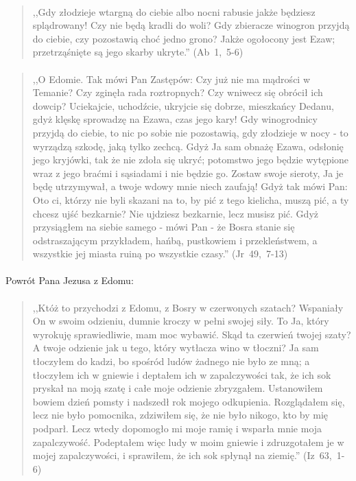 \documentclass[10pt,a4paper,oneside]{article}
\begin{document}
\paragraph{}
\begin{quote}
,,Gdy złodzieje wtargną do ciebie albo nocni rabusie jakże będziesz splądrowany! Czy nie będą kradli do woli? Gdy zbieracze winogron przyjdą do ciebie, czy pozostawią choć jedno grono? Jakże ogołocony jest Ezaw; przetrząśnięte są jego skarby ukryte.'' \mbox{(Ab 1, 5-6)}
\end{quote}
\paragraph{}
\begin{quote}
,,O Edomie. Tak mówi Pan Zastępów: Czy już nie ma mądrości w Temanie? Czy zginęła rada roztropnych? Czy wniwecz się obrócił ich dowcip? Uciekajcie, uchodźcie, ukryjcie się dobrze, mieszkańcy Dedanu, gdyż klęskę sprowadzę na Ezawa, czas jego kary! Gdy winogrodnicy przyjdą do ciebie, to nic po sobie nie pozostawią, gdy złodzieje w nocy - to wyrządzą szkodę, jaką tylko zechcą. Gdyż Ja sam obnażę Ezawa, odsłonię jego kryjówki, tak że nie zdoła się ukryć; potomstwo jego będzie wytępione wraz z jego braćmi i sąsiadami i nie będzie go. Zostaw swoje sieroty, Ja je będę utrzymywał, a twoje wdowy mnie niech zaufają! Gdyż tak mówi Pan: Oto ci, którzy nie byli skazani na to, by pić z tego kielicha, muszą pić, a ty chcesz ujść bezkarnie? Nie ujdziesz bezkarnie, lecz musisz pić. Gdyż przysiągłem na siebie samego - mówi Pan - że Bosra stanie się odstraszającym przykładem, hańbą, pustkowiem i przekleństwem, a wszystkie jej miasta ruiną po wszystkie czasy.'' \mbox{(Jr 49, 7-13)}
\end{quote}
\paragraph{}
Powrót Pana Jezusa z Edomu:
\paragraph{}
\begin{quote}
,,Któż to przychodzi z Edomu, z Bosry w czerwonych szatach? Wspaniały On w swoim odzieniu, dumnie kroczy w pełni swojej siły. To Ja, który wyrokuję sprawiedliwie, mam moc wybawić. Skąd ta czerwień twojej szaty? A twoje odzienie jak u tego, który wytłacza wino w tłoczni? Ja sam tłoczyłem do kadzi, bo spośród ludów żadnego nie było ze mną; a tłoczyłem ich w gniewie i deptałem ich w zapalczywości tak, że ich sok pryskał na moją szatę i całe moje odzienie zbryzgałem. Ustanowiłem bowiem dzień pomsty i nadszedł rok mojego odkupienia. Rozglądałem się, lecz nie było pomocnika, zdziwiłem się, że nie było nikogo, kto by mię podparł. Lecz wtedy dopomogło mi moje ramię i wsparła mnie moja zapalczywość. Podeptałem więc ludy w moim gniewie i zdruzgotałem je w mojej zapalczywości, i sprawiłem, że ich sok spłynął na ziemię.'' \mbox{(Iz 63, 1-6)}
\end{quote}
\end{document}
